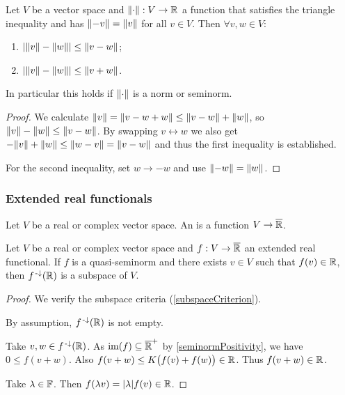 \begin{proposition} \label{reverseTriangleInequality}
Let $V$ be a vector space and $\lVert\cdot\rVert: V\to \mathbb{R}$ a function that satisfies the triangle inequality and has $\lVert-v\rVert = \lVert v\rVert$ for all $v\in V$. Then $\forall v,w\in V$:
\begin{enumerate}
\item $|\lVert v\rVert-\lVert w\rVert|\leq \lVert v-w\rVert$;
\item $|\lVert v\rVert-\lVert w\rVert|\leq \lVert v+w\rVert$.
\end{enumerate}
In particular this holds if $\lVert\cdot\rVert$ is a norm or seminorm.
\end{proposition}
\begin{proof}
We calculate $\lVert v\rVert = \lVert v-w+w\rVert \leq \lVert v-w\rVert + \lVert w\rVert$, so $\lVert v\rVert-\lVert w\rVert\leq \lVert v-w\rVert$. By swapping $v\leftrightarrow w$ we also get $-\lVert v\rVert+\lVert w\rVert\leq \lVert w-v\rVert = \lVert v-w\rVert$ and thus the first inequality is established.

For the second inequality, set $w\to -w$ and use $\lVert-w\rVert = \lVert w\rVert$.
\end{proof}

\subsubsection{Extended real functionals}
\begin{definition}
Let $V$ be a real or complex vector space. An  is a function $V \to \overline{\mathbb{R}}$.
\end{definition}

\begin{lemma} \label{realPartExtendedRealFunctional}
Let $V$ be a real or complex vector space and $f: V\to \overline{\mathbb{R}}$ an extended real functional. If $f$ is a quasi-seminorm and there exists $v\in V$ such that $f(v)\in\mathbb{R}$, then $f^{{\text{\hspace{0.15em}-}\downarrow}}(\mathbb{R})$ is a subspace of $V$. 
\end{lemma}
\begin{proof}
We verify the subspace criteria (\ref{subspaceCriterion}). 

By assumption, $f^{{\text{\hspace{0.15em}-}\downarrow}}(\mathbb{R})$ is not empty.

Take $v,w\in f^{{\text{\hspace{0.15em}-}\downarrow}}(\mathbb{R})$. As $\operatorname{im}(f) \subseteq \overline{\mathbb{R}}^+$ by \ref{seminormPositivity}, we have $0\leq f(v+w)$. Also $f(v+w)\leq K\big(f(v)+f(w)\big)\in \mathbb{R}$. Thus $f(v+w)\in\mathbb{R}$.

Take $\lambda\in\mathbb{F}$. Then $f(\lambda v) = |\lambda|f(v)\in \mathbb{R}$.
\end{proof}

